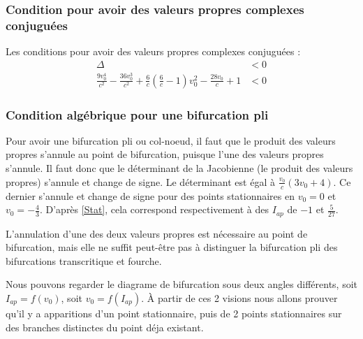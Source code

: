\documentclass[12pt,a4paper,onecolumn]{article}
\begin{document}
\subsubsection{Condition pour avoir des valeurs propres complexes conjuguées}


Les conditions pour avoir des valeurs propres complexes conjuguées :
\begin{align}
\Delta &< 0 \nonumber\\
\frac{9v_0^4}{c^2} - \frac{36v_0^3}{c^2} + \frac{6}{c}(\frac{6}{c} - 1)v_0^2 - \frac{28v_0}{c} + 1 &<0 \label{DeltaNeg}
\end{align}

\subsubsection{Condition algébrique pour une bifurcation pli}

Pour avoir une bifurcation pli ou col-noeud, il faut que le produit des valeurs propres s'annule au point de bifurcation, puisque l'une des valeurs propres s'annule. Il faut donc que le déterminant de la Jacobienne (le produit des valeurs propres) s'annule et change de signe. Le déterminant est égal à $\frac{v_0}{c} (3v_0 +4)$. Ce dernier s'annule et change de signe pour des points stationnaires en $v_0 = 0$ et $v_0 = -\frac{4}{3}$. D'après \ref{Stat}, cela correspond respectivement à des $I_{ap}$ de $-1$ et $\frac{5}{27}$.

L'annulation d'une des deux valeurs propres est nécessaire au point de bifurcation, mais elle ne suffit peut-être pas à distinguer la bifurcation pli des bifurcations transcritique et fourche.

Nous pouvons regarder le diagrame de bifurcation sous deux angles différents, soit $I_{ap}=f(v_0)$, soit $v_0=f(I_{ap})$. À partir de ces 2 visions nous allons prouver qu'il y a apparitions d'un point stationnaire, puis de 2 points stationnaires sur des branches distinctes du point déja existant.
\end{document}
